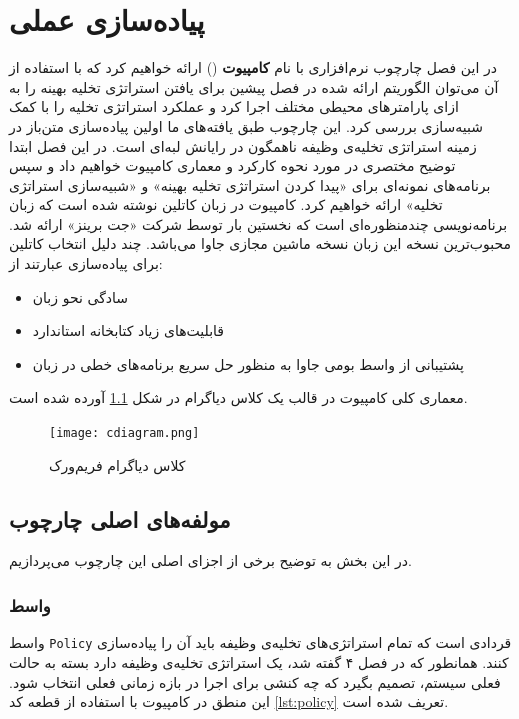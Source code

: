\chapter{پیاده‌سازی عملی}
در این فصل چارچوب نرم‌افزاری با نام \textbf{کامپیوت} () ارائه خواهیم کرد که با استفاده از آن می‌توان الگوریتم ارائه شده در فصل پیشین برای یافتن استراتژی تخلیه بهینه را به ازای پارامترهای محیطی مختلف اجرا کرد و عملکرد استراتژی تخلیه را با کمک شبیه‌سازی بررسی کرد. این چارچوب طبق یافته‌های ما اولین پیاده‌سازی متن‌باز در زمینه استراتژی تخلیه‌ی وظیفه ناهمگون در رایانش لبه‌ای است. در این فصل ابتدا توضیح مختصری در مورد نحوه کارکرد و معماری کامپیوت خواهیم داد و سپس برنامه‌های نمونه‌ای برای «پیدا کردن استراتژی تخلیه بهینه» و «شبیه‌سازی استراتژی تخلیه» ارائه خواهیم کرد. کامپیوت در زبان کاتلین نوشته شده است که زبان برنامه‌نویسی چندمنظوره‌ای است که نخستین بار توسط شرکت «جت برینز» ارائه شد. محبوب‌ترین نسخه این زبان نسخه ماشین مجازی جاوا می‌باشد. چند دلیل انتخاب کاتلین برای پیاده‌سازی \CurrentProject عبارتند از:
\begin{itemize}
	\item سادگی نحو زبان
	\item قابلیت‌های زیاد کتابخانه استاندارد
	\item پشتیبانی از واسط بومی جاوا به منظور حل سریع برنامه‌های خطی در زبان 
\end{itemize}
معماری کلی کامپیوت در قالب یک کلاس دیاگرام در شکل \ref{fig:classdiagram} آورده شده است. 
\begin{figure}[H]
	\centering
	\texttt{[image: cdiagram.png]}
	\caption{کلاس دیاگرام فریم‌ورک }
	\label{fig:classdiagram}
\end{figure}
\section{مولفه‌های اصلی چارچوب }
در این بخش به توضیح برخی از اجزای اصلی این چارچوب می‌پردازیم.
\subsection{واسط }
واسط \texttt{\footnotesize Policy} قردادی است که تمام استراتژی‌های تخلیه‌ی وظیفه باید آن را پیاده‌سازی کنند. همانطور که در فصل ۴ گفته شد، یک استراتژی تخلیه‌ی وظیفه دارد بسته به حالت فعلی سیستم، تصمیم بگیرد که چه کنشی برای اجرا در بازه زمانی فعلی انتخاب شود. این منطق در کامپیوت با استفاده از قطعه کد \ref{lst:policy} تعریف شده است.

